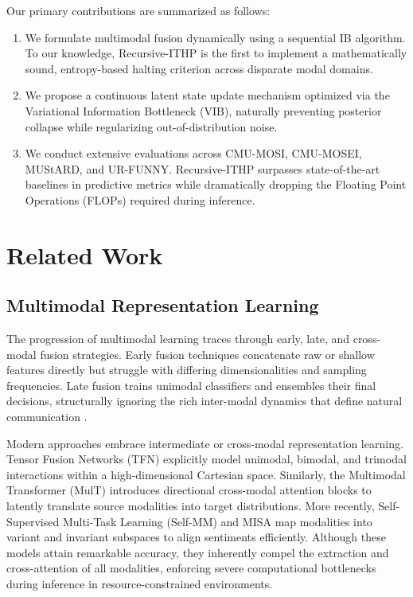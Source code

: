 \documentclass[11pt]{article}
\begin{document}
Our primary contributions are summarized as follows:
\begin{enumerate}
    \item We formulate multimodal fusion dynamically using a sequential IB algorithm. To our knowledge, Recursive-ITHP is the first to implement a mathematically sound, entropy-based halting criterion across disparate modal domains.
    \item We propose a continuous latent state update mechanism optimized via the Variational Information Bottleneck (VIB), naturally preventing posterior collapse while regularizing out-of-distribution noise.
    \item We conduct extensive evaluations across CMU-MOSI, CMU-MOSEI, MUStARD, and UR-FUNNY. Recursive-ITHP surpasses state-of-the-art baselines in predictive metrics while dramatically dropping the Floating Point Operations (FLOPs) required during inference. 
\end{enumerate}

\section{Related Work}
\label{sec:related_work}

\subsection{Multimodal Representation Learning}
The progression of multimodal learning traces through early, late, and cross-modal fusion strategies. Early fusion techniques concatenate raw or shallow features directly but struggle with differing dimensionalities and sampling frequencies. Late fusion trains unimodal classifiers and ensembles their final decisions, structurally ignoring the rich inter-modal dynamics that define natural communication \citep{poria2017review}.

Modern approaches embrace intermediate or cross-modal representation learning. Tensor Fusion Networks (TFN) explicitly model unimodal, bimodal, and trimodal interactions within a high-dimensional Cartesian space. Similarly, the Multimodal Transformer (MulT) introduces directional cross-modal attention blocks to latently translate source modalities into target distributions. More recently, Self-Supervised Multi-Task Learning (Self-MM) and MISA map modalities into variant and invariant subspaces to align sentiments efficiently. Although these models attain remarkable accuracy, they inherently compel the extraction and cross-attention of all modalities, enforcing severe computational bottlenecks during inference in resource-constrained environments.
\end{document}
